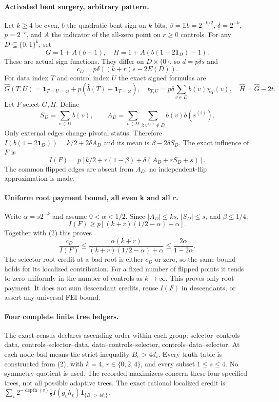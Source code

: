\documentclass{article}
\begin{document}
\paragraph{Activated bent surgery, arbitrary pattern.}
Let $k\ge4$ be even, $b$ the quadratic bent sign on $k$ bits,
$\beta=\mathbb E b=2^{-k/2}$, $\delta=2^{-k}$, $p=2^{-r}$,
and $A$ the indicator of the all-zero point on $r\ge0$ controls.
For any $D\subseteq\{0,1\}^k$, set
\[
G=1+A(b-1),\quad H=1+A(b(1-2\mathbf1_D)-1).
\]
These are actual sign functions. They differ on $D\times\{0\}$,
so $d=p\delta s$ and
\[
c_D=p\delta((k+r)s-2E(D)). \tag{2}
\]
For data index $T$ and control index $U$ the exact signed formulas are
\[
\widehat G(T,U)=\mathbf1_{T=U=\varnothing}
+p(\widehat b(T)-\mathbf1_{T=\varnothing}),
\quad t_{T,U}=p\delta\sum_{v\in D}b(v)\chi_T(v),
\quad \widehat H=\widehat G-2t.
\]
Let $F$ select $G,H$. Define
\[
S_D=\sum_{v\in D}b(v),\qquad
A_D=\sum_{v\in D}\sum_{i:v^{(i)}\notin D} b(v)b(v^{(i)}).
\]
Only external edges change pivotal status. Therefore
$I(b(1-2\mathbf1_D))=k/2+2\delta A_D$ and its mean is
$\beta-2\delta S_D$. The exact influence of $F$ is
\[
\boxed{I(F)=p\left[k/2+r(1-\beta)
+\delta(A_D+rS_D+s)\right].} \tag{3}
\]
The common flipped edges are absent from $A_D$: no independent-flip
approximation is made.

\paragraph{Uniform root payment bound, all even k and all r.}
Write $\alpha=s2^{-k}$ and assume $0<\alpha<1/2$.
Since $|A_D|\le ks$, $|S_D|\le s$, and $\beta\le1/4$,
\[
I(F)\ge p[(k+r)(1/2-\alpha)+\alpha].
\]
Together with (2) this proves
\[
\boxed{\frac{c_D}{I(F)}
\le\frac{\alpha(k+r)}{(k+r)(1/2-\alpha)+\alpha}
\le\frac{2\alpha}{1-2\alpha}.} \tag{4}
\]
The selector-root credit at a bad root is either $c_D$ or zero,
so the same bound holds for its localized contribution. For a fixed
number of flipped points it tends to zero uniformly in the number
of controls as $k\to\infty$.
This proves only root payment. It does not sum descendant credits,
reuse $I(F)$ in descendants, or assert any universal FEI bound.

\paragraph{Four complete finite tree ledgers.}
The exact census declares ascending order within each group:
selector--controls--data, controls--selector--data,
data--controls--selector, controls--data--selector.
At each node bad means the strict inequality $B_v>4d_v$.
Every truth table is constructed from (2), with $k=4$,
$r\in\{0,2,4\}$, and every subset $1\le s\le4$.
No symmetry quotient is used. The recorded maximizers concern
these four specified trees, not all possible adaptive trees.
The exact rational localized credit is
$\sum_v2^{-\operatorname{depth}(v)}\tfrac12 I(g_vh_v)
\mathbf1_{\{B_v>4d_v\}}$.
\end{document}
